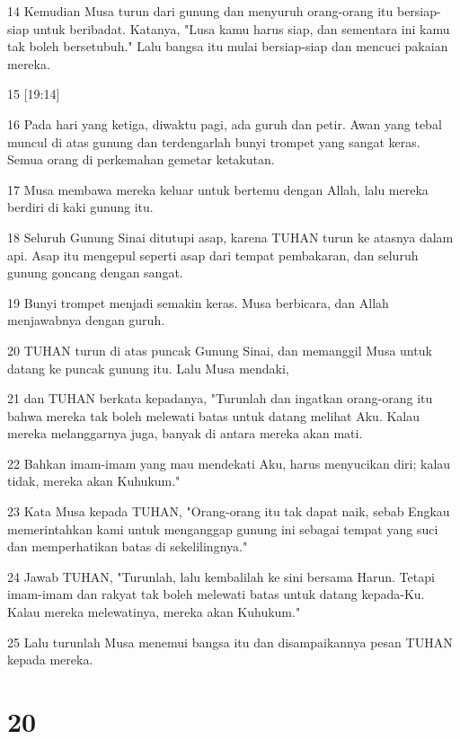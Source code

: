 \par 14 Kemudian Musa turun dari gunung dan menyuruh orang-orang itu bersiap-siap untuk beribadat. Katanya, "Lusa kamu harus siap, dan sementara ini kamu tak boleh bersetubuh." Lalu bangsa itu mulai bersiap-siap dan mencuci pakaian mereka.
\par 15 [19:14]
\par 16 Pada hari yang ketiga, diwaktu pagi, ada guruh dan petir. Awan yang tebal muncul di atas gunung dan terdengarlah bunyi trompet yang sangat keras. Semua orang di perkemahan gemetar ketakutan.
\par 17 Musa membawa mereka keluar untuk bertemu dengan Allah, lalu mereka berdiri di kaki gunung itu.
\par 18 Seluruh Gunung Sinai ditutupi asap, karena TUHAN turun ke atasnya dalam api. Asap itu mengepul seperti asap dari tempat pembakaran, dan seluruh gunung goncang dengan sangat.
\par 19 Bunyi trompet menjadi semakin keras. Musa berbicara, dan Allah menjawabnya dengan guruh.
\par 20 TUHAN turun di atas puncak Gunung Sinai, dan memanggil Musa untuk datang ke puncak gunung itu. Lalu Musa mendaki,
\par 21 dan TUHAN berkata kepadanya, "Turunlah dan ingatkan orang-orang itu bahwa mereka tak boleh melewati batas untuk datang melihat Aku. Kalau mereka melanggarnya juga, banyak di antara mereka akan mati.
\par 22 Bahkan imam-imam yang mau mendekati Aku, harus menyucikan diri; kalau tidak, mereka akan Kuhukum."
\par 23 Kata Musa kepada TUHAN, "Orang-orang itu tak dapat naik, sebab Engkau memerintahkan kami untuk menganggap gunung ini sebagai tempat yang suci dan memperhatikan batas di sekelilingnya."
\par 24 Jawab TUHAN, "Turunlah, lalu kembalilah ke sini bersama Harun. Tetapi imam-imam dan rakyat tak boleh melewati batas untuk datang kepada-Ku. Kalau mereka melewatinya, mereka akan Kuhukum."
\par 25 Lalu turunlah Musa menemui bangsa itu dan disampaikannya pesan TUHAN kepada mereka.

\chapter{20}


